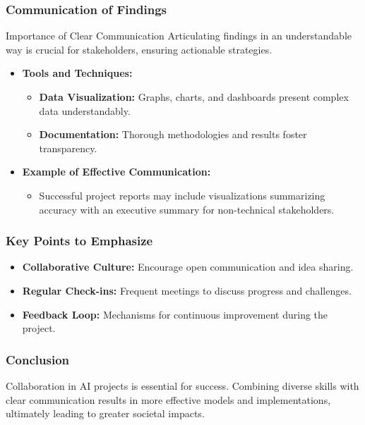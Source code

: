 \documentclass[aspectratio=169]{beamer}
\begin{document}
\begin{frame}[fragile]
    \frametitle{Communication of Findings}
    \begin{block}{Importance of Clear Communication}
        Articulating findings in an understandable way is crucial for stakeholders, ensuring actionable strategies.
    \end{block}
    
    \begin{itemize}
        \item \textbf{Tools and Techniques:}
        \begin{itemize}
            \item \textbf{Data Visualization:} Graphs, charts, and dashboards present complex data understandably.
            \item \textbf{Documentation:} Thorough methodologies and results foster transparency.
        \end{itemize}

        \item \textbf{Example of Effective Communication:}
        \begin{itemize}
            \item Successful project reports may include visualizations summarizing accuracy with an executive summary for non-technical stakeholders.
        \end{itemize}
    \end{itemize}
\end{frame}

\begin{frame}[fragile]
    \frametitle{Key Points to Emphasize}
    \begin{itemize}
        \item \textbf{Collaborative Culture:} Encourage open communication and idea sharing.
        \item \textbf{Regular Check-ins:} Frequent meetings to discuss progress and challenges.
        \item \textbf{Feedback Loop:} Mechanisms for continuous improvement during the project.
    \end{itemize}
\end{frame}

\begin{frame}[fragile]
    \frametitle{Conclusion}
    Collaboration in AI projects is essential for success. Combining diverse skills with clear communication results in more effective models and implementations, ultimately leading to greater societal impacts.
\end{frame}
\end{document}
